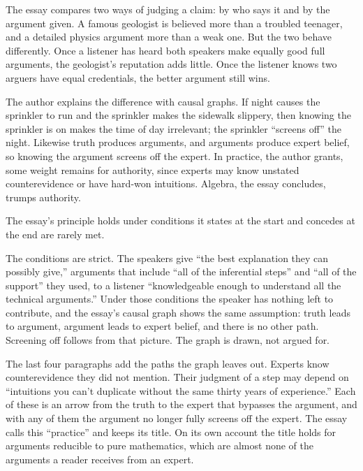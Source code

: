 \begin{afterword}
\summaryhead

The essay compares two ways of judging a claim: by who says it and by the argument given. A famous geologist is believed more than a troubled teenager, and a detailed physics argument more than a weak one. But the two behave differently. Once a listener has heard both speakers make equally good full arguments, the geologist's reputation adds little. Once the listener knows two arguers have equal credentials, the better argument still wins.

The author explains the difference with causal graphs. If night causes the sprinkler to run and the sprinkler makes the sidewalk slippery, then knowing the sprinkler is on makes the time of day irrelevant; the sprinkler ``screens off'' the night. Likewise truth produces arguments, and arguments produce expert belief, so knowing the argument screens off the expert. In practice, the author grants, some weight remains for authority, since experts may know unstated counterevidence or have hard-won intuitions. Algebra, the essay concludes, trumps authority.

\responsehead

The essay's principle holds under conditions it states at the start and concedes at the end are rarely met.

The conditions are strict. The speakers give ``the best explanation they can possibly give,'' arguments that include ``all of the inferential steps'' and ``all of the support'' they used, to a listener ``knowledgeable enough to understand all the technical arguments.'' Under those conditions the speaker has nothing left to contribute, and the essay's causal graph shows the same assumption: truth leads to argument, argument leads to expert belief, and there is no other path. Screening off follows from that picture. The graph is drawn, not argued for.

The last four paragraphs add the paths the graph leaves out. Experts know counterevidence they did not mention. Their judgment of a step may depend on ``intuitions you can't duplicate without the same thirty years of experience.'' Each of these is an arrow from the truth to the expert that bypasses the argument, and with any of them the argument no longer fully screens off the expert. The essay calls this ``practice'' and keeps its title. On its own account the title holds for arguments reducible to pure mathematics, which are almost none of the arguments a reader receives from an expert.


\end{afterword}
